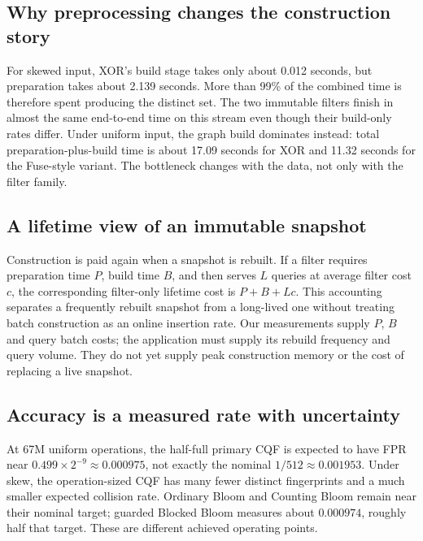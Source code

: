 \subsection{Why preprocessing changes the construction story}
For skewed input, XOR's build stage takes only about 0.012 seconds, but preparation takes about 2.139 seconds. More than 99\% of the combined time is therefore spent producing the distinct set. The two immutable filters finish in almost the same end-to-end time on this stream even though their build-only rates differ. Under uniform input, the graph build dominates instead: total preparation-plus-build time is about 17.09 seconds for XOR and 11.32 seconds for the Fuse-style variant. The bottleneck changes with the data, not only with the filter family.

\subsection{A lifetime view of an immutable snapshot}
Construction is paid again when a snapshot is rebuilt. If a filter requires preparation time $P$, build time $B$, and then serves $L$ queries at average filter cost $c$, the corresponding filter-only lifetime cost is $P+B+Lc$. This accounting separates a frequently rebuilt snapshot from a long-lived one without treating batch construction as an online insertion rate. Our measurements supply $P$, $B$ and query batch costs; the application must supply its rebuild frequency and query volume. They do not yet supply peak construction memory or the cost of replacing a live snapshot.
\clearpage

\subsection{Accuracy is a measured rate with uncertainty}
At 67M uniform operations, the half-full primary CQF is expected to have FPR near $0.499\times2^{-9}\approx0.000975$, not exactly the nominal $1/512\approx0.001953$. Under skew, the operation-sized CQF has many fewer distinct fingerprints and a much smaller expected collision rate. Ordinary Bloom and Counting Bloom remain near their nominal target; guarded Blocked Bloom measures about $0.000974$, roughly half that target. These are different achieved operating points.

